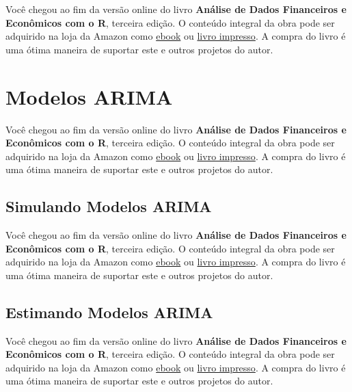 \documentclass[
  11pt,
]{book}
\newenvironment{pleasebuyit}
{\begin{noteblock}
		
	} {\end{noteblock}}
\begin{document}
\begin{pleasebuyit}
Você chegou ao fim da versão online do livro \textbf{Análise de Dados
Financeiros e Econômicos com o R}, terceira edição. O conteúdo integral
da obra pode ser adquirido na loja da Amazon como
\href{https://www.amazon.com.br/dp/B08WNC27ZY}{ebook} ou
\href{https://www.amazon.com/dp/B08WP8CCDB}{livro impresso}. A compra do
livro é uma ótima maneira de suportar este e outros projetos do autor.
\end{pleasebuyit}

\hypertarget{modelos-arima}{%
\section{Modelos ARIMA}\label{modelos-arima}}

\begin{pleasebuyit}
Você chegou ao fim da versão online do livro \textbf{Análise de Dados
Financeiros e Econômicos com o R}, terceira edição. O conteúdo integral
da obra pode ser adquirido na loja da Amazon como
\href{https://www.amazon.com.br/dp/B08WNC27ZY}{ebook} ou
\href{https://www.amazon.com/dp/B08WP8CCDB}{livro impresso}. A compra do
livro é uma ótima maneira de suportar este e outros projetos do autor.
\end{pleasebuyit}

\hypertarget{simulando-modelos-arima}{%
\subsection{Simulando Modelos ARIMA}\label{simulando-modelos-arima}}

\begin{pleasebuyit}
Você chegou ao fim da versão online do livro \textbf{Análise de Dados
Financeiros e Econômicos com o R}, terceira edição. O conteúdo integral
da obra pode ser adquirido na loja da Amazon como
\href{https://www.amazon.com.br/dp/B08WNC27ZY}{ebook} ou
\href{https://www.amazon.com/dp/B08WP8CCDB}{livro impresso}. A compra do
livro é uma ótima maneira de suportar este e outros projetos do autor.
\end{pleasebuyit}

\hypertarget{arima-estimating}{%
\subsection{Estimando Modelos ARIMA}\label{arima-estimating}}

\begin{pleasebuyit}
Você chegou ao fim da versão online do livro \textbf{Análise de Dados
Financeiros e Econômicos com o R}, terceira edição. O conteúdo integral
da obra pode ser adquirido na loja da Amazon como
\href{https://www.amazon.com.br/dp/B08WNC27ZY}{ebook} ou
\href{https://www.amazon.com/dp/B08WP8CCDB}{livro impresso}. A compra do
livro é uma ótima maneira de suportar este e outros projetos do autor.
\end{pleasebuyit}
\end{document}
